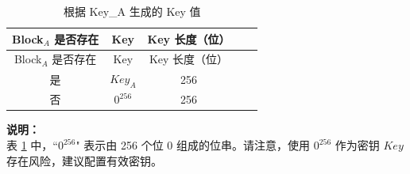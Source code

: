 \begin{longtable}[c]{ |c|c|c|c|c| }
\caption{根据 Key\_A 生成的 Key 值}
\label{tab:extmemencr-key-possibility}
\\\hline 
\rowcolor{lightgray}
Block$_A$ 是否存在& Key  & Key 长度（位） \\\hline
\endfirsthead
\hline
\rowcolor{lightgray}
Block$_A$ 是否存在& Key  & Key 长度（位） \\\hline
\endhead
\endfoot
是       &   $\mathit{Key}_{A}$    &   256   \\\hline
否        &   $0^{256}$    &   256   \\\hline
\end{longtable}
\vspace{-1.5em}
{\bfseries 说明：}\\
表 \ref{tab:extmemencr-key-possibility} 中，``$0^{256}$" 表示由 256 个位 0 组成的位串。请注意，使用 $0^{256}$ 作为密钥 $\mathit{Key}$ 存在风险，建议配置有效密钥。